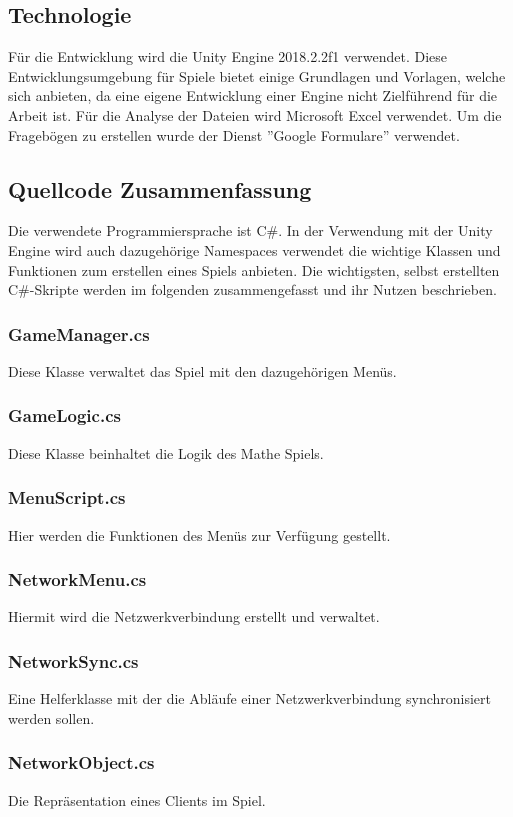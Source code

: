 \subsection{Technologie}
Für die Entwicklung wird die Unity Engine 2018.2.2f1 verwendet. Diese Entwicklungsumgebung für Spiele bietet einige Grundlagen und Vorlagen, welche sich anbieten, da eine eigene Entwicklung einer Engine nicht Zielführend für die Arbeit ist. Für die Analyse der Dateien wird Microsoft Excel verwendet. Um die Fragebögen zu erstellen wurde der Dienst ''Google Formulare'' verwendet.

\subsection{Quellcode Zusammenfassung}
Die verwendete Programmiersprache ist C\#. In der Verwendung mit der Unity Engine wird auch dazugehörige Namespaces verwendet die wichtige Klassen und Funktionen zum erstellen eines Spiels anbieten. Die wichtigsten, selbst erstellten C\#-Skripte werden im folgenden zusammengefasst und ihr Nutzen beschrieben.
\subsubsection{GameManager.cs}
Diese Klasse verwaltet das Spiel mit den dazugehörigen Menüs.
\subsubsection{GameLogic.cs}
Diese Klasse beinhaltet die Logik des Mathe Spiels.
\subsubsection{MenuScript.cs}
Hier werden die Funktionen des Menüs zur Verfügung gestellt.
\subsubsection{NetworkMenu.cs}
Hiermit wird die Netzwerkverbindung erstellt und verwaltet.
\subsubsection{NetworkSync.cs}
Eine Helferklasse mit der die Abläufe einer Netzwerkverbindung synchronisiert werden sollen.
\subsubsection{NetworkObject.cs}
Die Repräsentation eines Clients im Spiel.

